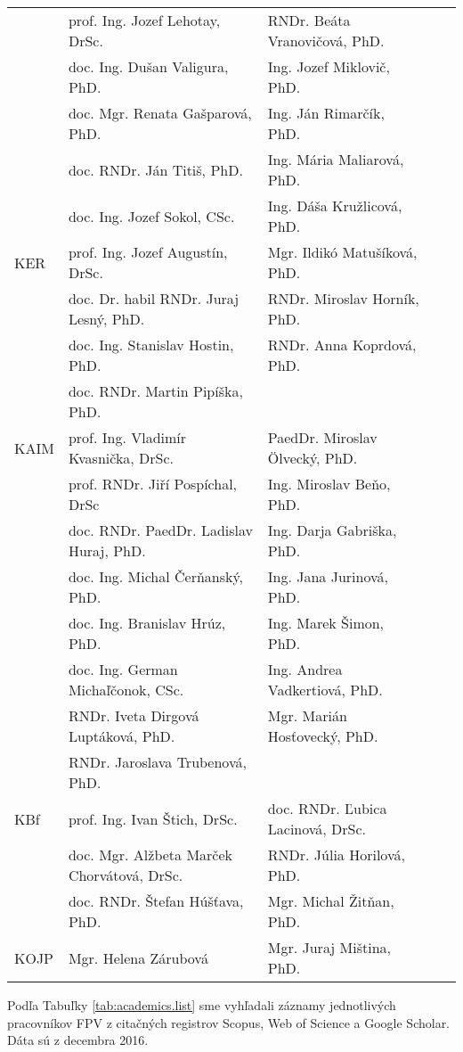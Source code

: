 \begin{table}
\begin{tabular}{lllll}
       & prof. Ing. Jozef Lehotay, DrSc. & RNDr. Beáta Vranovičová, PhD. \\
       & doc. Ing. Dušan Valigura, PhD. & Ing. Jozef Miklovič, PhD. \\
       & doc. Mgr. Renata Gašparová, PhD. & Ing. Ján Rimarčík, PhD. \\
       & doc. RNDr. Ján Titiš, PhD. & Ing. Mária Maliarová, PhD. \\
       & doc. Ing. Jozef Sokol, CSc. & Ing. Dáša Kružlicová, PhD. \\ [2ex]
  KER  & prof. Ing. Jozef Augustín, DrSc. & Mgr. Ildikó Matušíková, PhD. \\
       & doc. Dr. habil RNDr. Juraj Lesný, PhD. & RNDr. Miroslav Horník, PhD. \\
       & doc. Ing. Stanislav Hostin, PhD. &  RNDr. Anna Koprdová, PhD.\\
       & doc. RNDr. Martin Pipíška, PhD. &  \\[2ex]
  KAIM & prof. Ing. Vladimír Kvasnička, DrSc. & PaedDr. Miroslav Ölvecký, PhD. \\
       & prof. RNDr. Jiří Pospíchal, DrSc & Ing. Miroslav Beňo, PhD. \\
       & doc. RNDr. PaedDr. Ladislav Huraj, PhD. & Ing. Darja Gabriška, PhD. \\
       & doc. Ing. Michal Čerňanský, PhD. & Ing. Jana Jurinová, PhD.  \\
       & doc. Ing. Branislav Hrúz, PhD. & Ing. Marek Šimon, PhD. \\
       & doc. Ing. German Michaľčonok, CSc. & Ing. Andrea Vadkertiová, PhD. \\
       & RNDr. Iveta Dirgová Luptáková, PhD. & Mgr. Marián Hosťovecký, PhD. \\
       & RNDr. Jaroslava Trubenová, PhD. &  \\[2ex]
  KBf  & prof. Ing. Ivan Štich, DrSc.  & doc. RNDr. Ľubica Lacinová, DrSc. \\
       & doc. Mgr. Alžbeta Marček Chorvátová, DrSc. & RNDr. Júlia Horilová, PhD. \\
       & doc. RNDr. Štefan Húšťava, PhD. & Mgr. Michal Žitňan, PhD. \\[2ex]
  KOJP & Mgr. Helena Zárubová & Mgr. Juraj Miština, PhD. \\[0.5ex]
  \bottomrule
\end{tabular}
\end{table}

Podľa Tabuľky \ref{tab:academics.list} sme vyhľadali záznamy jednotlivých
pracovníkov FPV z citačných registrov Scopus, Web of Science a Google Scholar.
Dáta sú z decembra 2016.

